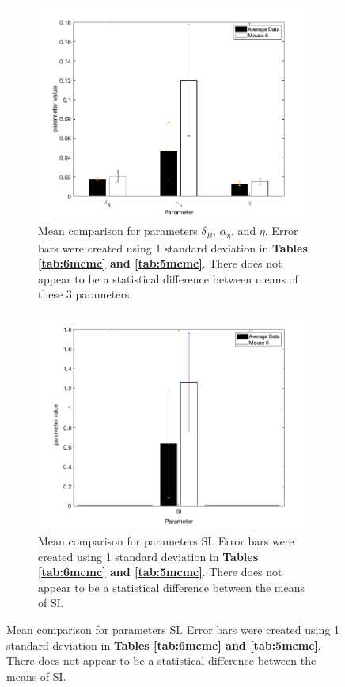 \begin{figure}[H]
\begin{subfigure}{.5\textwidth}
    \centering
    \includegraphics[width=.8\linewidth]{MCMC_figs/dram_t1d_final/mouse6_avg_paramComp1.png}
    \caption{Mean comparison for parameters $\delta_B$, $\alpha_{\eta}$, and $\eta$. Error bars were created using 1 standard deviation in \textbf{Tables \ref{tab:6mcmc} and \ref{tab:5mcmc}}. There does not appear to be a statistical difference between means of these 3 parameters.}
    \label{fig:22mcmc}
\end{subfigure}
\begin{subfigure}{.5\textwidth}
    \centering    
    \includegraphics[width=.8\linewidth]{MCMC_figs/dram_t1d_final/mouse6_avg_paramComp_SIONLY.png}
    \caption{Mean comparison for parameters SI. Error bars were created using 1 standard deviation in \textbf{Tables \ref{tab:6mcmc} and \ref{tab:5mcmc}}. There does not appear to be a statistical difference between the means of SI.}

\end{subfigure}
\end{figure}
